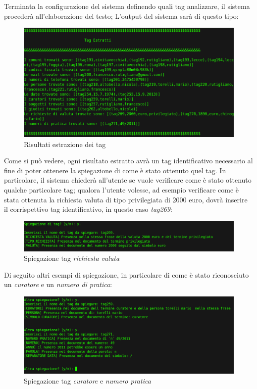 Terminata la configurazione del sistema definendo quali tag analizzare, il sistema procederà all'elaborazione del testo; L'output del sistema sarà di questo tipo:
\begin{figure}[H]
	\includegraphics[width=1\textwidth]{img/interfaces/CLI-result.png}
	\caption[Schermata CLI result]{Risultati estrazione dei tag}
	\label{CLI-result}
\end{figure}

Come si può vedere, ogni risultato estratto avrà un tag identificativo necessario al fine di poter ottenere la spiegazione di come è stato ottenuto quel tag. In particolare, il sistema chiederà all'utente se vuole verificare come è stato ottenuto qualche particolare tag; qualora l'utente volesse, ad esempio verificare come è stata ottenuta la richiesta valuta di tipo privilegiata di 2000 euro, dovrà inserire il corrispettivo tag identificativo, in questo caso \emph{tag269}:

\begin{figure}[H]
	\includegraphics[width=1\textwidth]{img/interfaces/CLI-spiegazioneRich.png}
	\caption[Schermata CLI spiegazione]{Spiegazione tag \emph{richiesta valuta}}
	\label{CLI-spiegaRichiesta}
\end{figure}

Di seguito altri esempi di spiegazione, in particolare di come è stato riconosciuto un \emph{curatore} e un \emph{numero di pratica}:
\begin{figure}[H]
	\includegraphics[width=1\textwidth]{img/interfaces/CLI-spiegazione.png}
	\caption[Schermata CLI altre spiegazioni]{Spiegazione tag \emph{curatore} e \emph{numero pratica}}
	\label{CLI-spiega}
\end{figure}


